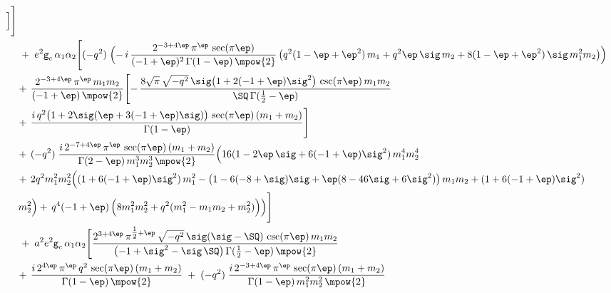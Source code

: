 \begin{tcolorbox}[thesisresultbox, title=\textit{Full one loop amplitude in small $|q|$ expansion}, boxsep=0.5mm, left=0.5mm, right=0.5mm, top=0.5mm, bottom=0.5mm]
\begin{align*}
\Bigr]
\Biggr]
\\& \hspace{0cm}\;+\; e^{2}\texttt{g}_c\,\alpha_1\alpha_2\Biggl[
 (-q^2)\;
 \Bigl(-\, i\,\frac{2^{-3+4\ep}\,\pi^{\ep}\,\sec(\pi\ep)}
             {(-1+\ep)^{2}\,\Gamma(1-\ep)\,\mpow{2}}\,
   \bigl( q^{2}(1-\ep+\ep^{2})\,m_1 + q^{2}\ep\,\sig\,m_2 + 8(1-\ep+\ep^{2})\,\sig\,m_1^{2} m_2 \bigr)\Bigr)
\\
&\hspace{0cm}
 +\,
 \frac{2^{-3+4\ep}\,\pi^{\ep}\,m_1 m_2}
             {(-1+\ep)\,\mpow{2}}
\Biggl[
  -\,\frac{8\sqrt{\pi}\,\sqrt{-q^2}\,\sig\bigl(1+2(-1+\ep)\sig^{2}\bigr)\,\csc(\pi\ep)\,m_1 m_2}{\SQ\,\Gamma(\tfrac12-\ep)}
  \\ &
  \hspace{0cm}+\,\frac{i\,q^{2}\bigl(1+2\sig(\ep+3(-1+\ep)\sig)\bigr)\,\sec(\pi\ep)\,(m_1+m_2)}{\Gamma(1-\ep)}
\Biggr]
\\
&\hspace{0cm}
 +\,(-q^2)\;
 \frac{i\,2^{-7+4\ep}\,\pi^{\ep}\,\sec(\pi\ep)\,(m_1+m_2)}
             {\Gamma(2-\ep)\,m_1^{3} m_2^{3}\,\mpow{2}}
\Bigl(
 16(1-2\ep\,\sig+6(-1+\ep)\sig^{2})\,m_1^{4} m_2^{4}
\\
&\hspace{0cm}
 +\,2 q^{2} m_1^{2} m_2^{2}\Bigl((1+6(-1+\ep)\sig^{2})\,m_1^{2}
    - \bigl(1-6(-8+\sig)\sig + \ep(8-46\sig+6\sig^{2})\bigr)\,m_1 m_2
    + (1+6(-1+\ep)\sig^{2})
\\
&\hspace{0cm}
\,m_2^{2}\Bigr) +\, q^{4}(-1+\ep)\,\Bigl(8 m_1^{2} m_2^{2} + q^{2}(m_1^{2}-m_1 m_2 + m_2^{2})\Bigr)
\Bigr)
\Biggr]
\\&\hspace{0cm}\;+\; a^{2} e^{2} \texttt{g}_c\,\alpha_1\alpha_2\Biggl[
 \frac{2^{3+4\ep}\,\pi^{\tfrac12+\ep}\,\sqrt{-q^2}\,\sig(\sig-\SQ)\,\csc(\pi\ep)\,m_1 m_2}
      {\bigl(-1+\sig^{2}-\sig\,\SQ\bigr)\,\Gamma(\tfrac12-\ep)\,\mpow{2}}
\\
&\hspace{0cm}
 +\,\frac{i\,2^{4\ep}\,\pi^{\ep}\,q^{2}\,\sec(\pi\ep)\,(m_1+m_2)}{\Gamma(1-\ep)\,\mpow{2}}
 \;+\;
 (-q^2)\;
 \frac{i\,2^{-3+4\ep}\,\pi^{\ep}\,\sec(\pi\ep)\,(m_1+m_2)}
             {\Gamma(1-\ep)\,m_1^{2} m_2^{2}\,\mpow{2}}

\end{align*}
\end{tcolorbox}
